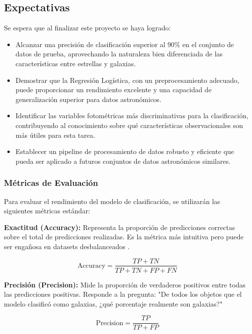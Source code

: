 \documentclass{article}
\begin{document}
\subsection{Expectativas}

Se espera que al finalizar este proyecto se haya logrado:

\begin{itemize}
    \item Alcanzar una precisión de clasificación superior al 90\% en el conjunto de datos de prueba, aprovechando la naturaleza bien diferenciada de las características entre estrellas y galaxias.
    \item Demostrar que la Regresión Logística, con un preprocesamiento adecuado, puede proporcionar un rendimiento excelente y una capacidad de generalización superior para datos astronómicos.
    \item Identificar las variables fotométricas más discriminativas para la clasificación, contribuyendo al conocimiento sobre qué características observacionales son más útiles para esta tarea.
    \item Establecer un pipeline de procesamiento de datos robusto y eficiente que pueda ser aplicado a futuros conjuntos de datos astronómicos similares.
\end{itemize}

\subsubsection{Métricas de Evaluación}

Para evaluar el rendimiento del modelo de clasificación, se utilizarán las siguientes métricas estándar:

\textbf{Exactitud (Accuracy):} Representa la proporción de predicciones correctas sobre el total de predicciones realizadas. Es la métrica más intuitiva pero puede ser engañosa en datasets desbalanceados \cite{accuracy_metric}.

\begin{equation}
\text{Accuracy} = \frac{TP + TN}{TP + TN + FP + FN}
\end{equation}

\textbf{Precisión (Precision):} Mide la proporción de verdaderos positivos entre todas las predicciones positivas. Responde a la pregunta: "De todos los objetos que el modelo clasificó como galaxias, ¿qué porcentaje realmente son galaxias?" \cite{precision_metric}

\begin{equation}
\text{Precision} = \frac{TP}{TP + FP}
\end{equation}
\end{document}
